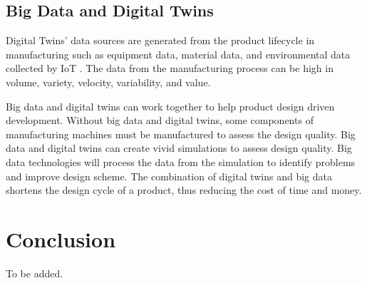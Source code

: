 \documentclass[article]{aaltoseries}
\begin{document}
\subsection{Big Data and Digital Twins}
Digital Twins' data sources are generated from the product lifecycle in manufacturing such as equipment data, material data, and environmental data collected by IoT \cite{TAO2019183}. The data from the manufacturing process can be high in volume, variety, velocity, variability, and value.

Big data and digital twins can work together to help product design driven development. Without big data and digital twins, some components of manufacturing machines must be manufactured to assess the design quality. Big data and digital twins can create vivid simulations to assess design quality. Big data technologies will process the data from the simulation to identify problems and improve design scheme. The combination of digital twins and big data shortens the design cycle of a product, thus reducing the cost of time and money.





\section{Conclusion}

To be added.






\end{document}
